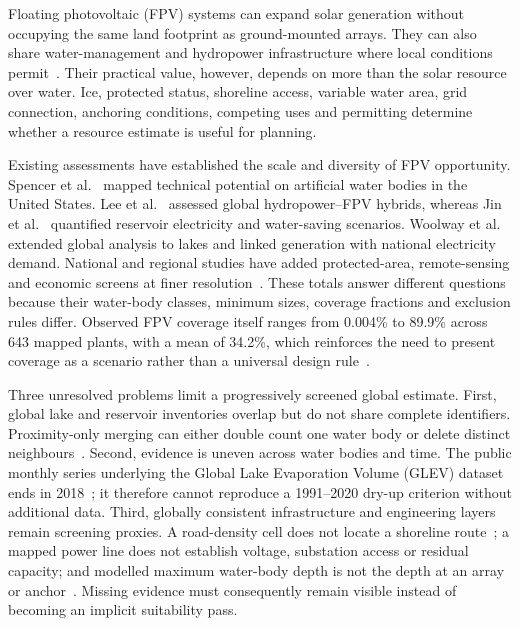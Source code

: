 Floating photovoltaic (FPV) systems can expand solar generation without occupying the same land footprint as ground-mounted arrays. They can also share water-management and hydropower infrastructure where local conditions permit~\citep{sahu2016,lee2020}. Their practical value, however, depends on more than the solar resource over water. Ice, protected status, shoreline access, variable water area, grid connection, anchoring conditions, competing uses and permitting determine whether a resource estimate is useful for planning.

Existing assessments have established the scale and diversity of FPV opportunity. Spencer et al.~\citep{spencer2019} mapped technical potential on artificial water bodies in the United States. Lee et al.~\citep{lee2020} assessed global hydropower--FPV hybrids, whereas Jin et al.~\citep{jin2023} quantified reservoir electricity and water-saving scenarios. Woolway et al.~\citep{woolway2024} extended global analysis to lakes and linked generation with national electricity demand. National and regional studies have added protected-area, remote-sensing and economic screens at finer resolution~\citep{lopes2022,ates2022,faruqui2023,munozceron2023,jung2024,rosenlieb2025}. These totals answer different questions because their water-body classes, minimum sizes, coverage fractions and exclusion rules differ. Observed FPV coverage itself ranges from 0.004\% to 89.9\% across 643 mapped plants, with a mean of 34.2\%, which reinforces the need to present coverage as a scenario rather than a universal design rule~\citep{nobre2024}.

Three unresolved problems limit a progressively screened global estimate. First, global lake and reservoir inventories overlap but do not share complete identifiers. Proximity-only merging can either double count one water body or delete distinct neighbours~\citep{lehner2011,messager2016,wang2022geodar}. Second, evidence is uneven across water bodies and time. The public monthly series underlying the Global Lake Evaporation Volume (GLEV) dataset ends in 2018~\citep{zhao2022glev}; it therefore cannot reproduce a 1991--2020 dry-up criterion without additional data. Third, globally consistent infrastructure and engineering layers remain screening proxies. A road-density cell does not locate a shoreline route~\citep{meijer2018grip}; a mapped power line does not establish voltage, substation access or residual capacity; and modelled maximum water-body depth is not the depth at an array or anchor~\citep{khazaei2022globathy}. Missing evidence must consequently remain visible instead of becoming an implicit suitability pass.

